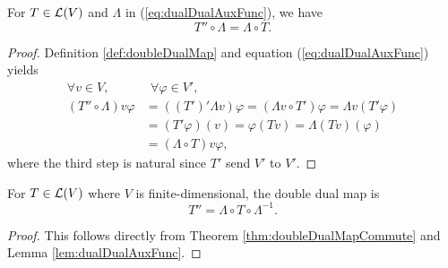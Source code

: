 \begin{thm}
  \label{thm:doubleDualMapCommute}
  For $T\in {\cal L}(V)$ and $\Lambda$ in (\ref{eq:dualDualAuxFunc}),
   we have
   \begin{equation}
     \label{eq:doubleDualMapCommute}
     T''\circ \Lambda = \Lambda\circ T.
   \end{equation}
\end{thm}
\begin{proof}
  Definition \ref{def:doubleDualMap} and
   equation (\ref{eq:dualDualAuxFunc}) yields
   \begin{align*}
     \forall v\in V,&\ \ \forall \varphi\in V',
     \\
     (T''\circ \Lambda) v \varphi
     &= ((T')' \Lambda v) \varphi
     = (\Lambda v \circ T')\varphi
     = \Lambda v ( T'\varphi)
     \\
     &= (T' \varphi) (v)
     = \varphi(Tv)
     = \Lambda(Tv)(\varphi)
       \\
     &= (\Lambda\circ T) v \varphi,
   \end{align*}
   where the third step is natural
   since $T'$ send $V'$ to $V'$.
\end{proof}

\begin{coro}
  \label{coro:doubleDualMapFiniteDim}
  For $T\in {\cal L}(V)$ where $V$ is finite-dimensional,
   the double dual map is
   \begin{equation}
     \label{eq:doubleDualMapFiniteDim}
     T'' = \Lambda\circ T \circ \Lambda^{-1}.
   \end{equation}
\end{coro}
\begin{proof}
  This follows directly from Theorem \ref{thm:doubleDualMapCommute}
   and Lemma \ref{lem:dualDualAuxFunc}.
\end{proof}



